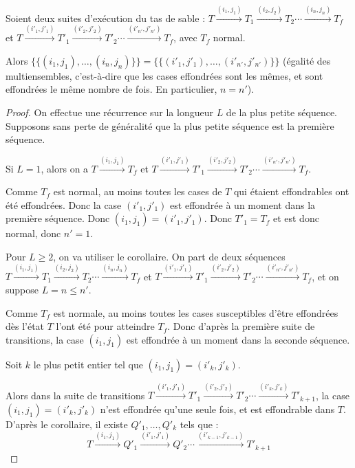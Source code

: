 \begin{theo}
Soient deux suites d'exécution du tas de sable : $T\xrightarrow{(i_1,j_1)}T_1\xrightarrow{(i_2,j_2)}T_2\cdots\xrightarrow{(i_n,j_n)}T_f$ et $T\xrightarrow{(i'_1,j'_1)}T'_1\xrightarrow{(i'_2,j'_2)}T'_2\cdots\xrightarrow{(i'_{n'},j'_{n'})}T_f$, avec $T_f$ normal. 

Alors $\{\!\!\{(i_1, j_1), \ldots, (i_n, j_n) \}\!\!\}=\{\!\!\{(i'_1, j'_1), \ldots, (i'_{n'}, j'_{n'}) \}\!\!\}$ (égalité des multiensembles, c'est-à-dire que les cases effondrées sont les mêmes, et sont effondrées le même nombre de fois. En particulier, $n=n'$).
\end{theo}

\begin{proof}
On effectue une récurrence sur la longueur $L$ de la plus petite séquence. Supposons sans perte de généralité que la plus petite séquence est la première séquence. 

Si $L=1$, alors on a $T\xrightarrow{(i_1,j_1)}T_f$ et $T\xrightarrow{(i'_1,j'_1)}T'_1\xrightarrow{(i'_2,j'_2)}T'_2\cdots\xrightarrow{(i'_{n'},j'_{n'})}T_f$. 

Comme $T_f$ est normal, au moins toutes les cases de $T$ qui étaient effondrables ont été effondrées. Donc la case $(i'_1, j'_1)$ est effondrée à un moment dans la première séquence. Donc $(i_1, j_1)=(i'_1, j'_1)$. Donc $T'_1=T_f$ et est donc normal, donc $n'=1$.

Pour $L\geqslant2$, on va utiliser le corollaire. On part de deux séquences $T\xrightarrow{(i_1,j_1)}T_1\xrightarrow{(i_2,j_2)}T_2\cdots\xrightarrow{(i_n,j_n)}T_f$ et $T\xrightarrow{(i'_1,j'_1)}T'_1\xrightarrow{(i'_2,j'_2)}T'_2\cdots\xrightarrow{(i'_{n'},j'_{n'})}T_f$, et on suppose $L=n\leqslant n'$.

Comme $T_f$ est normale, au moins toutes les cases susceptibles d'être effondrées dès l'état $T$ l'ont été pour atteindre $T_f$. Donc d'après la première suite de transitions, la case $(i_1, j_1)$ est effondrée à un moment dans la seconde séquence.

Soit $k$ le plus petit entier tel que $(i_1, j_1)=(i'_k, j'_k)$.

Alors dans la suite de transitions $T\xrightarrow{(i'_1,j'_1)}T'_1\xrightarrow{(i'_2,j'_2)}T'_2\cdots\xrightarrow{(i'_{k},j'_{k})}T'_{k+1}$, la case $(i_1, j_1)=(i'_k, j'_k)$ n'est effondrée qu'une seule fois, et est effondrable dans $T$. D'après le corollaire, il existe $Q'_1, \ldots, Q'_{k}$ tels que :
$$T\xrightarrow{(i_1,j_1)}Q'_1\xrightarrow{(i'_1,j'_1)}Q'_2\cdots\xrightarrow{(i'_{k-1},j'_{k-1})}T'_{k+1}$$


\end{proof}
